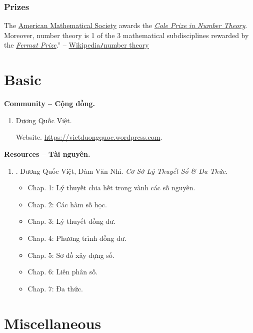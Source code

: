 \documentclass{article}
\begin{document}
\subsubsection{Prizes}
The \href{https://en.wikipedia.org/wiki/American_Mathematical_Society}{American Mathematical Society} awards the \href{https://en.wikipedia.org/wiki/Cole_Prize}{\it Cole Prize in Number Theory}. Moreover, number theory is 1 of the 3 mathematical subdisciplines rewarded by the \href{https://en.wikipedia.org/wiki/Fermat_Prize}{\it Fermat Prize}.'' -- \href{https://en.wikipedia.org/wiki/Number_theory}{Wikipedia{\tt/}number theory}


\section{Basic}
\textbf{\textsf{Community -- Cộng đồng.}}
\begin{enumerate}
	\item {\sc Dương Quốc Việt}.
	
	{\sf Website.} \url{https://vietduongquoc.wordpress.com}.
\end{enumerate}

\textbf{\textsf{Resources -- Tài nguyên.}}
\begin{enumerate}
	\item \cite{Viet_Nhi_number_theory_polynomial}. {\sc Dương Quốc Việt, Đàm Văn Nhỉ}. {\it Cơ Sở Lý Thuyết Số \& Đa Thức}.
	
	\begin{itemize}
		\item {\sf Chap. 1: Lý thuyết chia hết trong vành các số nguyên.}
		\item {\sf Chap. 2: Các hàm số học.}
		\item {\sf Chap. 3: Lý thuyết đồng dư.}
		\item {\sf Chap. 4: Phương trình đồng dư.}
		\item {\sf Chap. 5: Sơ đồ xây dựng số.}
		\item {\sf Chap. 6: Liên phân số.}
		\item {\sf Chap. 7: Đa thức.}
	\end{itemize}
\end{enumerate}


\section{Miscellaneous}


\printbibliography[heading=bibintoc]
	
\end{document}
